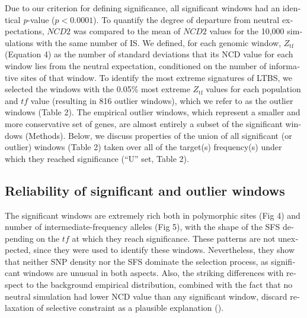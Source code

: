 \begin{refsection}
\begin{otherlanguage}{english}
Due to our criterion for defining significance, all significant windows had an identical \emph{p}-value ($p<0.0001$). To quantify the degree of departure from neutral expectations, $NCD2$ was compared to the mean of $NCD2$ values for the 10,000 simulations with the same number of IS. We defined, for each genomic window, $Z_{\mathrm{tf}}$ (Equation 4) as the number of standard deviations that its NCD value for each window lies from the neutral expectation, conditioned on the number of informative sites of that window. To identify the most extreme signatures of LTBS, we selected the windows with the 0.05\% most extreme $Z_{\mathrm{tf}}$ values for each population and $tf$ value (resulting in 816 outlier windows), which we refer to as the outlier windows (Table 2). The empirical outlier windows, which represent a smaller and more conservative set of genes, are almost entirely a subset of the significant windows (Methods). Below, we discuss properties of the union of all significant (or outlier) windows (Table 2) taken over all of the target(s) frequency(s) under which they reached significance (“U” set, Table 2).

\subsection{Reliability of significant and outlier windows}
The significant windows are extremely rich both in polymorphic sites (Fig 4) and number of intermediate-frequency alleles (Fig 5), with the shape of the SFS depending on the $tf$ at which they reach significance. These patterns are not unexpected, since they were used to identify these windows. Nevertheless, they show that neither SNP density nor the SFS dominate the selection process, as significant windows are unusual in both aspects. Also, the striking differences with respect to the background empirical distribution, combined with the fact that no neutral simulation had lower NCD value than any significant window, discard relaxation of selective constraint as a plausible explanation (\cite{Andres2009}).


\end{otherlanguage}
\end{refsection}
